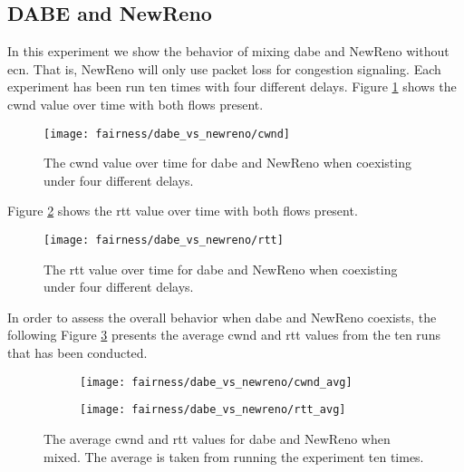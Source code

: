 \subsection{DABE and NewReno}

In this experiment we show the behavior of mixing \gls{dabe} and NewReno without \gls{ecn}. That is, NewReno will only use packet loss for congestion signaling. Each experiment has been run ten times with four different delays. Figure \ref{fig:dabe_and_newreno_cwnd} shows the \gls{cwnd} value over time with both flows present.

\begin{figure}[H]
    \centering
    \texttt{[image: fairness/dabe\_vs\_newreno/cwnd]}
    \captionsetup{width=1.0\linewidth}
    \caption{The \gls{cwnd} value over time for \gls{dabe} and NewReno when coexisting under four different delays.}
    \label{fig:dabe_and_newreno_cwnd}
\end{figure}

Figure \ref{fig:dabe_and_newreno_rtt} shows the \gls{rtt} value over time with both flows present.

\begin{figure}[H]
    \centering
    \texttt{[image: fairness/dabe\_vs\_newreno/rtt]}
    \captionsetup{width=1.0\linewidth}
    \caption{The \gls{rtt} value over time for \gls{dabe} and NewReno when coexisting under four different delays.}
    \label{fig:dabe_and_newreno_rtt}
\end{figure}

In order to assess the overall behavior when \gls{dabe} and NewReno coexists, the following Figure \ref{fig:dabe_and_newreno_avg} presents the average \gls{cwnd} and \gls{rtt} values from the ten runs that has been conducted.

\begin{figure}[H]
    \centering
    \begin{subfigure}{0.5\linewidth}
        \centering
        \texttt{[image: fairness/dabe\_vs\_newreno/cwnd\_avg]}
    \end{subfigure}%
    \begin{subfigure}{0.5\linewidth}
        \centering
        \texttt{[image: fairness/dabe\_vs\_newreno/rtt\_avg]}
    \end{subfigure}
    \caption{The average \gls{cwnd} and \gls{rtt} values for \gls{dabe} and NewReno when mixed. The average is taken from running the experiment ten times.}
    \label{fig:dabe_and_newreno_avg}
\end{figure}

